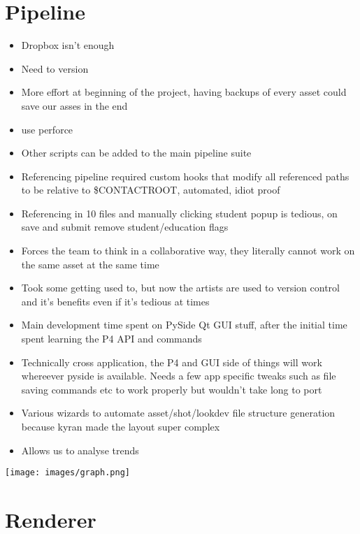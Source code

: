 \documentclass[11pt,a4paper,final,notitlepage]{report}
\begin{document}
\chapter{Pipeline}

\begin{itemize}
	\item Dropbox isn't enough
	\item Need to version
	\item More effort at beginning of the project, having backups of every asset could save our asses in the end
	\item use perforce
	\item Other scripts can be added to the main pipeline suite
	\item Referencing pipeline required custom hooks that modify all referenced paths to be relative to \$CONTACTROOT, automated, idiot proof
	\item Referencing in 10 files and manually clicking student popup is tedious, on save and submit remove student/education flags
	\item Forces the team to think in a collaborative way, they literally cannot work on the same asset at the same time
	\item Took some getting used to, but now the artists are used to version control and it's benefits even if it's tedious at times
	\item Main development time spent on PySide Qt GUI stuff, after the initial time spent learning the P4 API and commands
	\item Technically cross application, the P4 and GUI side of things will work whereever pyside is available. Needs a few app specific tweaks such as file saving commands etc to work properly but wouldn't take long to port
	\item Various wizards to automate asset/shot/lookdev file structure generation because kyran made the layout super complex
	\item Allows us to analyse trends
\end{itemize}


\texttt{[image: images/graph.png]}

\chapter{Renderer}
\end{document}
